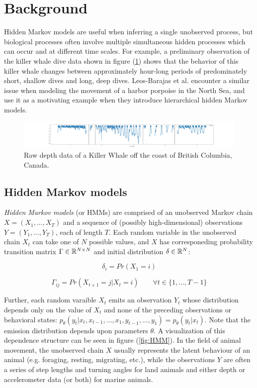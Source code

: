 
\section{Background}

Hidden Markov models are useful when inferring a single unobserved process, but biological processes often involve multiple simultaneous hidden processes which can occur and at different time scales. For example, a preliminary observation of the killer whale dive data shown in figure (\ref{fig:data}) shows that the behavior of this killer whale changes between approximately hour-long periods of predominately short, shallow dives and long, deep dives. Leos-Barajas et al. encounter a similar issue when modeling the movement of a harbor porpoise in the North Sea, and use it as a motivating example when they introduce hierarchical hidden Markov models.

\begin{figure}[h!]
	\centering
	\includegraphics[width=6.5in]{../../Plots/raw_data.png}
	\caption{Raw depth data of a Killer Whale off the coast of British Columbia, Canada.}
	\label{fig:data}
\end{figure}

\subsection{Hidden Markov models}

\textit{Hidden Markov models} (or HMMs) are comprised of an unobserved Markov chain $X = (X_1, \ldots, X_T)$ and a sequence of (possibly high-dimensional) observations $Y = (Y_1, \ldots, Y_T)$, each of length $T$. Each random variable in the unobserved chain $X_t$ can take one of $N$ possible values, and $X$ has corresponeding probability transition matrix $\Gamma \in \mathbb{R}^{N \times N}$ and initial distribution $\delta \in \mathbb{R}^N$:

$$\delta_i = Pr(X_1 = i)$$

$$ \Gamma_{ij} = Pr(X_{t+1} = j | X_t = i) \qquad \forall t \in \{ 1, \ldots, T-1\} $$

Further, each random varaible $X_t$ emits an observation $Y_t$ whose distribution depends only on the value of $X_t$ and none of the preceding observations or behavioral states: $p_{\theta}(y_t|x_t, x_{t-1}, \ldots , x_1, y_{t-1}, \ldots , y_1) = p_{\theta}(y_t|x_t)$. Note that the emission distribution depends upon parameters $\theta$. A visualization of this dependence structure can be seen in figure (\ref{fig:HMM}). In the field of animal movement, the unobserved chain $X$ usually represents the latent behaviour of an animal (e.g. foraging, resting, migrating, etc.), while the observations $Y$ are often a series of step lengths and turning angles for land animals and either depth or accelerometer data (or both) for marine animals.

